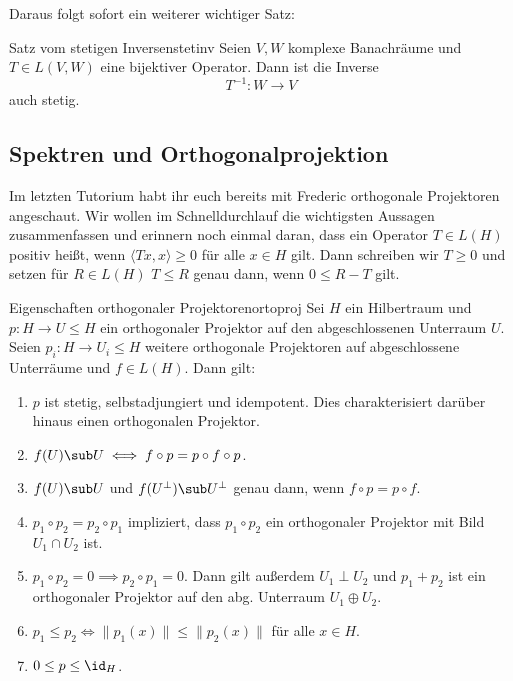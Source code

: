 Daraus folgt sofort ein weiterer wichtiger Satz:
\begin{satz}{Satz vom stetigen Inversen}{stetinv}
Seien $V,W$ komplexe Banachräume und $T \in L(V,W)$ eine bijektiver Operator. Dann ist die Inverse
\[
T^{-1}: W \to V
\]
auch stetig.
\end{satz}

\subsection{Spektren und Orthogonalprojektion}

Im letzten Tutorium habt ihr euch bereits mit Frederic orthogonale Projektoren angeschaut. Wir wollen im Schnelldurchlauf die wichtigsten Aussagen zusammenfassen und erinnern noch einmal daran, dass ein Operator $T \in L(H)$ positiv heißt, wenn $\langle Tx,x \rangle \geq 0$ für alle $x \in H$ gilt. Dann schreiben wir $T \geq 0$ und setzen für $R \in L(H)$ $T \leq R$ genau dann, wenn $0 \leq R -T$ gilt.

\begin{satz}{Eigenschaften orthogonaler Projektoren}{ortoproj}
Sei $H$ ein Hilbertraum und $p: H \to U \leq H$ ein orthogonaler Projektor auf den abgeschlossenen Unterraum $U$. Seien $p_i: H \to U_i \leq H$ weitere orthogonale Projektoren auf abgeschlossene Unterräume und $f \in L(H)$. Dann gilt:
\begin{enumerate}[({P}1)]
	\item $p$ ist stetig, selbstadjungiert und idempotent. Dies charakterisiert darüber hinaus einen orthogonalen Projektor.
	\item $f(U) \sub U \iff f \circ p = p \circ f \circ p$.
	\item $f(U) \sub U$ und $f(U^\perp) \sub U^\perp$ genau dann, wenn $f \circ p = p \circ f$.
	\item $p_1 \circ p_2 = p_2 \circ p_1$ impliziert, dass $p_1 \circ p_2$ ein orthogonaler Projektor mit Bild $U_1 \cap U_2$ ist.
	\item $p_1 \circ p_2 = 0 \implies p_2 \circ p_1 =0$. Dann gilt außerdem $U_1 \perp U_2$ und $p_1 + p_2$ ist ein orthogonaler Projektor auf den abg. Unterraum $U_1 \oplus U_2$.
	\item $p_1 \leq p_2 \iff \|p_1(x)\| \leq \|p_2(x)\|$ für alle $x \in H$.
	\item $0 \leq p \leq \id_H$.
\end{enumerate}
\end{satz}

